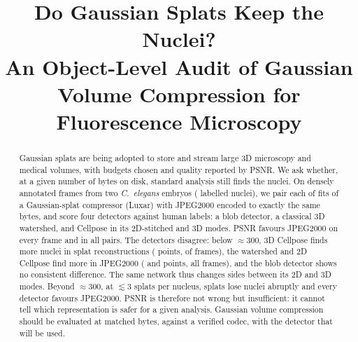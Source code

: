 \documentclass[conference]{IEEEtran}
\begin{document}
\title{Do Gaussian Splats Keep the Nuclei?\\An Object-Level Audit of Gaussian Volume Compression for Fluorescence Microscopy}

\author{
}

\maketitle

\begin{abstract}
Gaussian splats are being adopted to store and stream large 3D microscopy and medical
volumes, with budgets chosen and quality reported by PSNR. We ask whether, at a given number
of bytes on disk, standard analysis still finds the nuclei. On \NFrames{} densely annotated
frames from two \emph{C.~elegans} embryos (\NlabTotal{} labelled nuclei), we pair each of
\NFits{} fits of a Gaussian-splat compressor (Luxar) with JPEG2000 encoded to exactly the
same bytes, and score four detectors against human labels: a blob detector, a classical 3D
watershed, and Cellpose in its 2D-stitched and 3D modes. PSNR favours JPEG2000 on every frame
and in all \PSNRjtkWins{} pairs. The detectors disagree: below $\approx$\SI{300}{\times}, 3D
Cellpose finds more nuclei in splat reconstructions (\FrModCPthree{} points, \FrModCPthreePos{}
of \FrN{} frames), the watershed and 2D Cellpose find more in JPEG2000 (\FrModWS{} and
\FrModCP{} points, all \FrN{} frames), and the blob detector shows no consistent difference.
The same network thus changes sides between its 2D and 3D modes. Beyond
$\approx$\SI{300}{\times}, at $\lesssim$3 splats per nucleus, splats lose nuclei abruptly and
every detector favours JPEG2000. PSNR is therefore not wrong but insufficient: it cannot tell
which representation is safer for a given analysis. Gaussian volume compression should be
evaluated at matched bytes, against a verified codec, with the detector that will be used.
\end{abstract}
\end{document}
